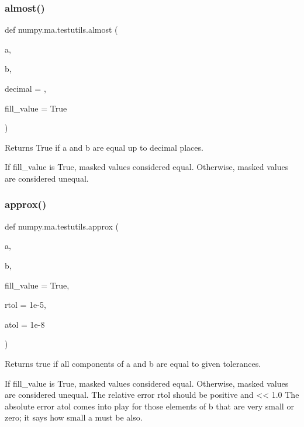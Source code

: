 \subsubsection{\texorpdfstring{almost()}{almost()}}
{\footnotesize\ttfamily def numpy.\+ma.\+testutils.\+almost (\begin{DoxyParamCaption}\item[{}]{a,  }\item[{}]{b,  }\item[{}]{decimal = {},  }\item[{}]{fill\+\_\+value = {\ttfamily True} }\end{DoxyParamCaption})}

\begin{DoxyVerb}Returns True if a and b are equal up to decimal places.

If fill_value is True, masked values considered equal. Otherwise,
masked values are considered unequal.\end{DoxyVerb}
 \mbox{\label{namespacenumpy_1_1ma_1_1testutils_a63e89230b485a280aee83e841a57e320}} 
\subsubsection{\texorpdfstring{approx()}{approx()}}
{\footnotesize\ttfamily def numpy.\+ma.\+testutils.\+approx (\begin{DoxyParamCaption}\item[{}]{a,  }\item[{}]{b,  }\item[{}]{fill\+\_\+value = {\ttfamily True},  }\item[{}]{rtol = {\ttfamily 1e-\/5},  }\item[{}]{atol = {\ttfamily 1e-\/8} }\end{DoxyParamCaption})}

\begin{DoxyVerb}Returns true if all components of a and b are equal to given tolerances.

If fill_value is True, masked values considered equal. Otherwise,
masked values are considered unequal.  The relative error rtol should
be positive and << 1.0 The absolute error atol comes into play for
those elements of b that are very small or zero; it says how small a
must be also.\end{DoxyVerb}
 \mbox{\label{namespacenumpy_1_1ma_1_1testutils_a1d3b6577ce3b9428c1803d7d4cd53595}} 

